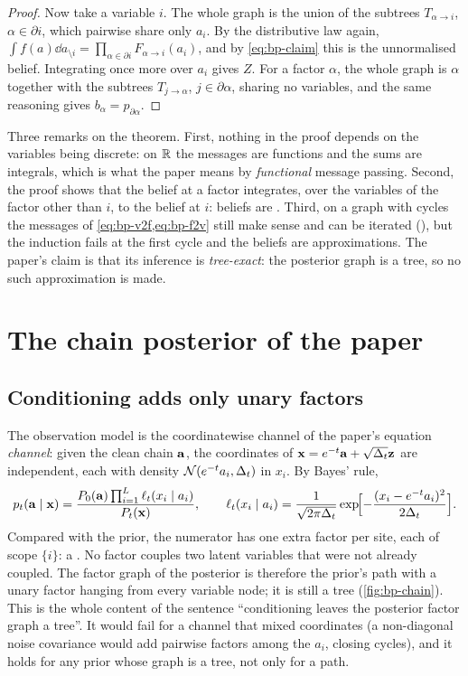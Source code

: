 \begin{proof}
Now take a variable $i$. The whole graph is the union of the subtrees $T_{\alpha\to i}$,
$\alpha\in\partial i$, which pairwise share only $a_i$. By the distributive law again,
$\int f(a)\dd a_{\setminus i}=\prod_{\alpha\in\partial i}F_{\alpha\to i}(a_i)$, and by
\cref{eq:bp-claim} this is the unnormalised belief. Integrating once more over $a_i$
gives $Z$. For a factor $\alpha$, the whole graph is $\alpha$ together with the subtrees
$T_{j\to\alpha}$, $j\in\partial\alpha$, sharing no variables, and the same reasoning gives
$b_\alpha=p_{\partial\alpha}$.
\end{proof}

Three remarks on the theorem. First, nothing in the proof depends on the variables
being discrete: on $\mathbb{R}$ the messages are functions and the sums are integrals,
which is what the paper means by \emph{functional} message passing. Second, the
proof shows that the belief at a factor integrates, over the variables of the factor
other than $i$, to the belief at $i$: beliefs are . Third,
on a graph with cycles the messages of \cref{eq:bp-v2f,eq:bp-f2v} still make sense
and can be iterated (), but the induction fails at the
first cycle and the beliefs are approximations. The paper's claim is that its
inference is \emph{tree-exact}: the posterior graph is a tree, so no such approximation
is made.

\section{The chain posterior of the paper}

\subsection{Conditioning adds only unary factors}

The observation model is the coordinatewise channel of the paper's equation
\emph{channel}: given the clean chain $\mathbf{a}$, the coordinates of
$\mathbf{x}=e^{-t}\mathbf{a}+\sqrt{\Delta_t}\mathbf{z}$ are independent, each with density
$\mathcal{N}\!\left(e^{-t}a_i,\Delta_t\right)$ in $x_i$. By Bayes' rule,
\begin{equation}
  p_t(\mathbf{a}\mid\mathbf{x})=\frac{P_0(\mathbf{a})\prod_{i=1}^{L}\ell_t(x_i\mid a_i)}{P_t(\mathbf{x})},\qquad
  \ell_t(x_i\mid a_i)=\frac{1}{\sqrt{2\pi\Delta_t}}\exp\!\Bigl[-\frac{(x_i-e^{-t}a_i)^2}{2\Delta_t}\Bigr].
  \label{eq:bp-posterior}
\end{equation}
Compared with the prior, the numerator has one extra factor per site, each of scope
$\{i\}$: a . No factor couples two latent variables that
were not already coupled. The factor graph of the posterior is therefore the prior's
path with a unary factor hanging from every variable node; it is still a tree
(\cref{fig:bp-chain}). This is the whole content of the sentence ``conditioning leaves
the posterior factor graph a tree''. It would fail for a channel that mixed coordinates
(a non-diagonal noise covariance would add pairwise factors among the $a_i$, closing
cycles), and it holds for any prior whose graph is a tree, not only for a path.

